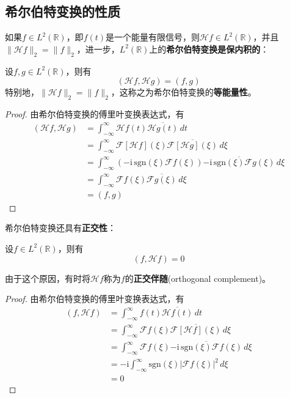 \subsection{希尔伯特变换的性质}\label{sub:prop_of_hilbert}

如果$f\in L^2(\mathbb{R})$，即$f(t)$是一个能量有限信号，则$\mathcal{H} f\in L^2(\mathbb{R})$，并且$\|\mathcal{H} f\|_2=\|f\|_2$，进一步，$L^2(\mathbb{R})$上的\textbf{希尔伯特变换是保内积的}：
\begin{theorem}
    设$f,g\in L^2(\mathbb{R})$，则有
    \[(\mathcal{H} f,\mathcal{H} g)=(f,g)\]
    特别地，$\|\mathcal{H} f\|_2=\|f\|_2$，这称之为希尔伯特变换的\textbf{等能量性}。
\end{theorem}
\begin{proof}
    由希尔伯特变换的傅里叶变换表达式，有
    \begin{align*}
        (\mathcal{H} f,\mathcal{H} g)&=\int_{-\infty}^{\infty}\mathcal{H} f(t)\overline{\mathcal{H} g(t)}\,dt\\
        &=\int_{-\infty}^{\infty}\mathcal{F} [\mathcal{H} f](\xi)\overline{\mathcal{F} [\mathcal{H} g](\xi)}\,d\xi\\
        &=\int_{-\infty}^{\infty}(-\mathrm{i}\,\text{sgn}(\xi)\mathcal{F} f(\xi))\overline{-\mathrm{i}\,\text{sgn}(\xi)\mathcal{F} g(\xi)}\,d\xi\\
        &=\int_{-\infty}^{\infty}\mathcal{F} f(\xi)\overline{\mathcal{F} g(\xi)}\,d\xi\\
        &=(f,g)
    \end{align*}
\end{proof}

希尔伯特变换还具有\textbf{正交性}：
\begin{theorem}
    设$f\in L^2(\mathbb{R})$，则有
    \[(f,\mathcal{H} f)=0\]
\end{theorem}
由于这个原因，有时将$\mathcal{H} f$称为$f$的\textbf{正交伴随}(orthogonal complement)。
\begin{proof}
    由希尔伯特变换的傅里叶变换表达式，有
    \begin{align*}
        (f,\mathcal{H} f)&=\int_{-\infty}^{\infty}f(t)\overline{\mathcal{H} f(t)}\,dt\\
        &=\int_{-\infty}^{\infty}\mathcal{F} f(\xi)\overline{\mathcal{F} [\mathcal{H} f](\xi)}\,d\xi\\
        &=\int_{-\infty}^{\infty}\mathcal{F} f(\xi)\overline{-\mathrm{i}\,\text{sgn}(\xi)\mathcal{F} f(\xi)}\,d\xi\\
        &=-\mathrm{i}\int_{-\infty}^{\infty}\text{sgn}(\xi)|\mathcal{F} f(\xi)|^2\,d\xi\\
        &=0
    \end{align*}
\end{proof}

